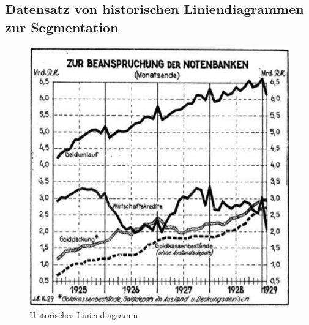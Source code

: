\clearpage

\subsection{Datensatz von historischen Liniendiagrammen zur Segmentation}
\label{ch:lines}

\begin{figure}[h!] %
    \centering
    \begin{minipage}{0.475\textwidth} %
        \centering
        \includegraphics[width=\linewidth]{Methodik/img/lines_historical.png}
        \caption{ Historisches Liniendiagramm \phantom{Platzhalter}}
        \label{fig:lines_historical}
    \end{minipage}\hfill %
    \begin{minipage}{0.475\textwidth} %
        \centering

\end{minipage}
\end{figure}
